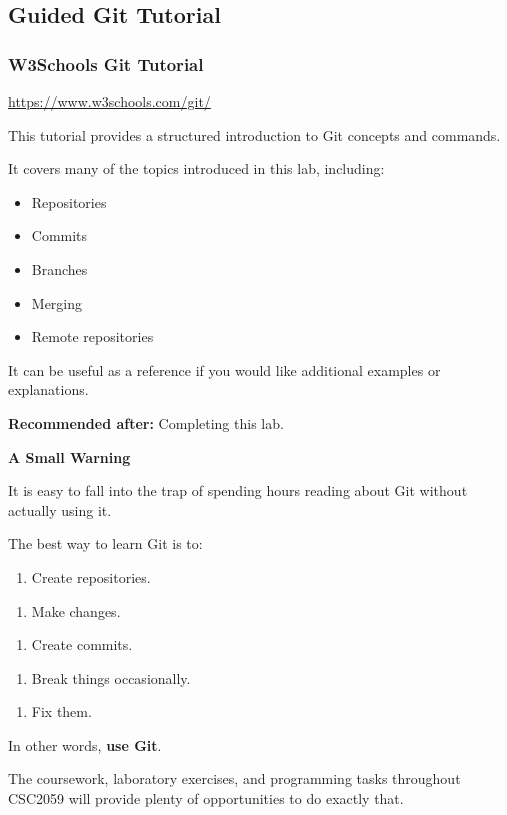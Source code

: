 \documentclass{csc2059practical}
\begin{document}
\subsection{Guided Git Tutorial}
\subsubsection{W3Schools Git Tutorial}
\url{https://www.w3schools.com/git/}

This tutorial provides a structured introduction to Git concepts and commands.

It covers many of the topics introduced in this lab, including:

\begin{itemize}
  \item Repositories
  \item Commits
  \item Branches
  \item Merging
  \item Remote repositories
\end{itemize}
It can be useful as a reference if you would like additional examples or explanations.

\textbf{Recommended after:} Completing this lab.

\begin{importantnote}
\textbf{A Small Warning}\par
\medskip

It is easy to fall into the trap of spending hours reading about Git without actually using it.


The best way to learn Git is to:


\begin{enumerate}
  \item Create repositories.
\end{enumerate}

\begin{enumerate}
  \item Make changes.
\end{enumerate}

\begin{enumerate}
  \item Create commits.
\end{enumerate}

\begin{enumerate}
  \item Break things occasionally.
\end{enumerate}

\begin{enumerate}
  \item Fix them.
\end{enumerate}

In other words, \textbf{use Git}.


The coursework, laboratory exercises, and programming tasks throughout CSC2059 will provide plenty of opportunities to do exactly that.


\end{importantnote}
\end{document}
